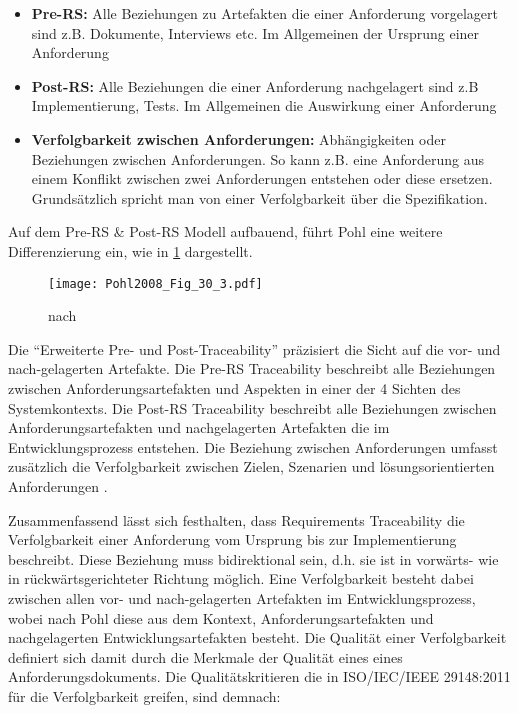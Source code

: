 \begin{itemize}
    \item \textbf{Pre-RS:} Alle Beziehungen zu Artefakten die einer Anforderung vorgelagert sind z.B. Dokumente, Interviews etc. Im Allgemeinen der Ursprung einer Anforderung
    \item \textbf{Post-RS:} Alle Beziehungen die einer Anforderung nachgelagert sind z.B Implementierung, Tests. Im Allgemeinen die Auswirkung einer Anforderung
    \item \textbf{Verfolgbarkeit zwischen Anforderungen:} Abhängigkeiten oder Beziehungen zwischen Anforderungen. So kann z.B. eine Anforderung aus einem Konflikt zwischen zwei Anforderungen entstehen oder diese ersetzen. Grundsätzlich spricht man von einer Verfolgbarkeit über die Spezifikation. \cite{Pohl2015BasiswissenIREB-Standard}
\end{itemize}

Auf dem Pre-RS \& Post-RS Modell aufbauend, führt Pohl eine weitere Differenzierung ein, wie in \ref{fig:abb_requirementstechniken} dargestellt.

\begin{figure}[!htb]
  \centering
  \texttt{[image: Pohl2008\_Fig\_30\_3.pdf]}
  \caption{nach \cite[Fig. 30.3]{Pohl2008RequirementsTechniken}}
  \label{fig:abb_requirementstechniken}
\end{figure}

Die \enquote{Erweiterte Pre- und Post-Traceability} präzisiert die Sicht auf die vor- und nach-gelagerten Artefakte. Die Pre-RS Traceability beschreibt alle Beziehungen zwischen Anforderungsartefakten und Aspekten in einer der 4 Sichten des Systemkontexts. Die Post-RS Traceability beschreibt alle Beziehungen zwischen Anforderungsartefakten und nachgelagerten Artefakten die im Entwicklungsprozess entstehen. Die Beziehung zwischen Anforderungen umfasst zusätzlich die Verfolgbarkeit zwischen Zielen, Szenarien und lösungsorientierten Anforderungen \cite{Pohl2008RequirementsTechniken}.

Zusammenfassend lässt sich festhalten, dass Requirements Traceability die Verfolgbarkeit einer Anforderung vom Ursprung bis zur Implementierung beschreibt. Diese Beziehung muss bidirektional sein, d.h. sie ist in vorwärts- wie in rückwärtsgerichteter Richtung möglich. Eine Verfolgbarkeit besteht dabei zwischen allen vor- und nach-gelagerten Artefakten im Entwicklungsprozess, wobei nach Pohl diese aus dem Kontext, Anforderungsartefakten und nachgelagerten Entwicklungsartefakten besteht. Die Qualität einer Verfolgbarkeit definiert sich damit durch die Merkmale der Qualität eines eines Anforderungsdokuments. Die Qualitätskritieren die in ISO/IEC/IEEE 29148:2011 für die Verfolgbarkeit greifen, sind demnach:

